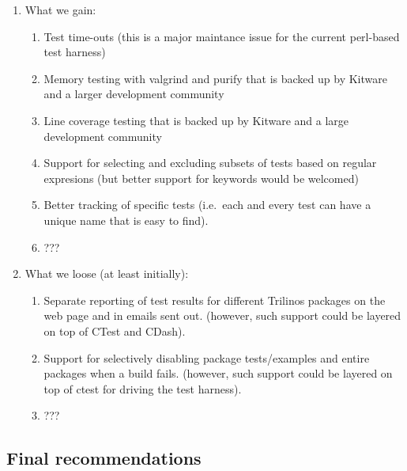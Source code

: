 \documentclass[pdf,ps2pdf,11pt]{SANDreport}
\begin{document}
\begin{enumerate}

{}\item What we gain:

  \begin{enumerate}

  {}\item Test time-outs (this is a major maintance issue for the
  current perl-based test harness)

  {}\item Memory testing with valgrind and purify that is backed up by
  Kitware and a larger development community

  {}\item Line coverage testing that is backed up by Kitware and a
  large development community

  {}\item Support for selecting and excluding subsets of tests based
  on regular expresions (but better support for keywords would be
  welcomed)

  {}\item Better tracking of specific tests (i.e.\ each and every test
  can have a unique name that is easy to find).

  {}\item ???

  \end{enumerate}

{}\item What we loose (at least initially):

  \begin{enumerate}

  {}\item Separate reporting of test results for different Trilinos
  packages on the web page and in emails sent out. (however, such
  support could be layered on top of CTest and CDash).

  {}\item Support for selectively disabling package tests/examples and
  entire packages when a build fails.  (however, such support could be
  layered on top of ctest for driving the test harness).

  {}\item ???

  \end{enumerate}

\end{enumerate}


%
\subsection{Final recommendations}
%
\end{document}

